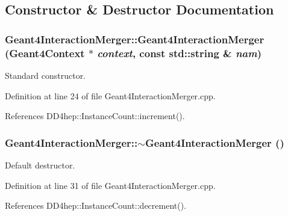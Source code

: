 \subsection{Constructor \& Destructor Documentation}
\hypertarget{class_d_d4hep_1_1_simulation_1_1_geant4_interaction_merger_ad80869d9440400a2d4936649441aa0aa}{
\subsubsection[{Geant4InteractionMerger}]{\setlength{\rightskip}{0pt plus 5cm}Geant4InteractionMerger::Geant4InteractionMerger ({\bf Geant4Context} $\ast$ {\em context}, \/  const std::string \& {\em nam})}}
\label{class_d_d4hep_1_1_simulation_1_1_geant4_interaction_merger_ad80869d9440400a2d4936649441aa0aa}


Standard constructor. 

Definition at line 24 of file Geant4InteractionMerger.cpp.

References DD4hep::InstanceCount::increment().\hypertarget{class_d_d4hep_1_1_simulation_1_1_geant4_interaction_merger_a2ef1b19a45945a77332eb85f2fe2d8bf}{
\subsubsection[{$\sim$Geant4InteractionMerger}]{\setlength{\rightskip}{0pt plus 5cm}Geant4InteractionMerger::$\sim$Geant4InteractionMerger ()}}
\label{class_d_d4hep_1_1_simulation_1_1_geant4_interaction_merger_a2ef1b19a45945a77332eb85f2fe2d8bf}


Default destructor. 

Definition at line 31 of file Geant4InteractionMerger.cpp.

References DD4hep::InstanceCount::decrement().

